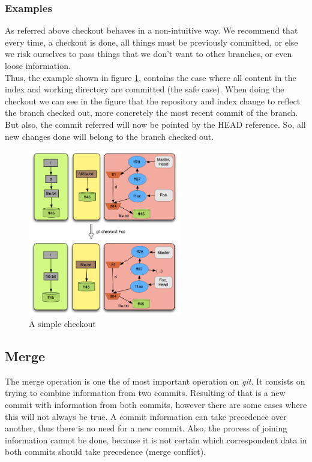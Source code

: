 \subsubsection{Examples}
As referred above checkout behaves in a non-intuitive way. We recommend that
every time, a checkout is done, all things must be previously committed, or else
we risk ourselves to pass things that we don't want to other branches, or even
loose information. \\
Thus, the example shown in figure \ref{fig:checkout}, contains the case where
all content in the index and working directory are committed (the safe case).
When doing the checkout we can see in the figure 
that the repository and index change to reflect the branch checked out, more
concretely the most recent commit of the branch. But
also, the commit referred will now be pointed by the HEAD reference. So, all new
changes done will belong to the branch checked out. \\


\begin{figure}[!t]
   \centering
   \includegraphics[width=0.6\textwidth]{images/checkout.png}
   \caption{A simple checkout}\label{fig:checkout}
\end{figure}

\subsection{Merge}

The merge operation is one the of most important operation on \emph{git}. It
consists on trying to combine information from two commits. Resulting of that
is a new commit with information from both commits, however there are some cases
where this will not always be true. A commit information can take precedence
over another, thus there is no need for a new commit. Also, the process of
joining information cannot be done, because it is not certain which
correspondent data in both commits should take precedence (merge conflict).\\

